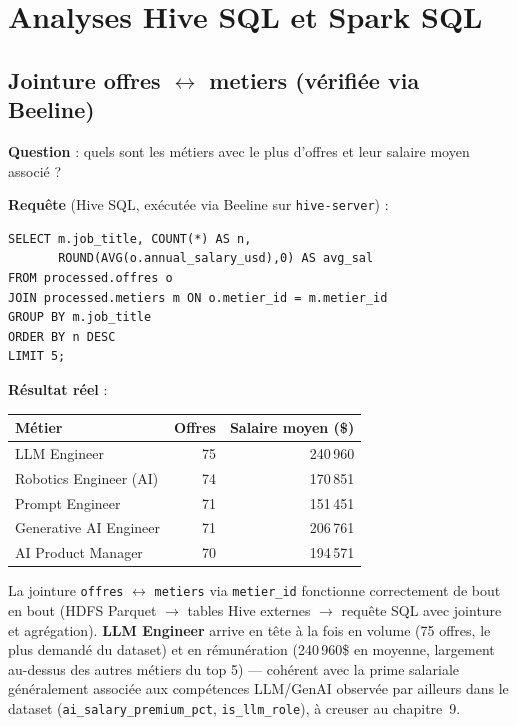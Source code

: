 \chapter{Analyses Hive SQL et Spark SQL}

\section{Jointure offres $\leftrightarrow$ metiers (vérifiée via Beeline)}

\textbf{Question} : quels sont les métiers avec le plus d'offres et
leur salaire moyen associé ?

\textbf{Requête} (Hive SQL, exécutée via Beeline sur
\texttt{hive-server}) :

\begin{verbatim}
SELECT m.job_title, COUNT(*) AS n,
       ROUND(AVG(o.annual_salary_usd),0) AS avg_sal
FROM processed.offres o
JOIN processed.metiers m ON o.metier_id = m.metier_id
GROUP BY m.job_title
ORDER BY n DESC
LIMIT 5;
\end{verbatim}

\textbf{Résultat réel} :

\begin{center}
\begin{tabular}{lrr}
\toprule
Métier & Offres & Salaire moyen (\$) \\
\midrule
LLM Engineer & 75 & 240\,960 \\
Robotics Engineer (AI) & 74 & 170\,851 \\
Prompt Engineer & 71 & 151\,451 \\
Generative AI Engineer & 71 & 206\,761 \\
AI Product Manager & 70 & 194\,571 \\
\bottomrule
\end{tabular}
\end{center}

\begin{constat}[Interprétation]
La jointure \texttt{offres} $\leftrightarrow$ \texttt{metiers} via
\texttt{metier\_id} fonctionne correctement de bout en bout (HDFS
Parquet $\to$ tables Hive externes $\to$ requête SQL avec jointure et
agrégation). \textbf{LLM Engineer} arrive en tête à la fois en volume
(75 offres, le plus demandé du dataset) et en rémunération (240\,960\$
en moyenne, largement au-dessus des autres métiers du top 5) — cohérent
avec la prime salariale généralement associée aux compétences LLM/GenAI
observée par ailleurs dans le dataset (\texttt{ai\_salary\_premium\_pct},
\texttt{is\_llm\_role}), à creuser au chapitre~9.
\end{constat}

